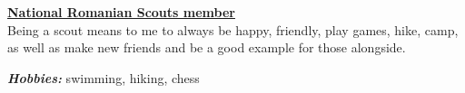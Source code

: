 \documentclass[margin,line]{resume}
\begin{document}
\begin{resume}
	\href{http://www.scoutpanaitescu.ro/}{\textbf{National Romanian Scouts member}}\vspace{1mm}\\
	Being a scout means to me to always be happy, friendly, play games, hike, camp, as well as make new friends and be a good example for those alongside.

	\textbf{\textit{Hobbies:}} swimming, hiking, chess



\end{resume}
\end{document}
